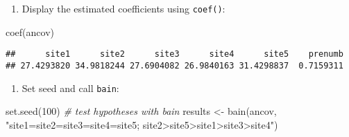 \documentclass[
]{book}
\newenvironment{Shaded}{\begin{snugshade}}{\end{snugshade}}
\newcommand{\CommentTok}[1]{\textcolor[rgb]{0.56,0.35,0.01}{\textit{#1}}}
\newcommand{\DecValTok}[1]{\textcolor[rgb]{0.00,0.00,0.81}{#1}}
\newcommand{\FunctionTok}[1]{\textcolor[rgb]{0.00,0.00,0.00}{#1}}
\newcommand{\NormalTok}[1]{#1}
\newcommand{\OtherTok}[1]{\textcolor[rgb]{0.56,0.35,0.01}{#1}}
\newcommand{\SpecialCharTok}[1]{\textcolor[rgb]{0.00,0.00,0.00}{#1}}
\newcommand{\StringTok}[1]{\textcolor[rgb]{0.31,0.60,0.02}{#1}}
\providecommand{\tightlist}{%
  \setlength{\itemsep}{0pt}\setlength{\parskip}{0pt}}
\begin{document}
\begin{Shaded}
\end{Shaded}

\begin{enumerate}
\def\labelenumi{\arabic{enumi})}
\setcounter{enumi}{1}
\tightlist
\item
  Display the estimated coefficients using \texttt{coef()}:
\end{enumerate}

\begin{Shaded}
\begin{Highlighting}[]
\FunctionTok{coef}\NormalTok{(ancov)}
\end{Highlighting}
\end{Shaded}

\begin{verbatim}
##      site1      site2      site3      site4      site5    prenumb 
## 27.4293820 34.9818244 27.6904082 26.9840163 31.4298837  0.7159311
\end{verbatim}

\begin{enumerate}
\def\labelenumi{\arabic{enumi})}
\setcounter{enumi}{2}
\tightlist
\item
  Set seed and call \texttt{bain}:
\end{enumerate}

\begin{Shaded}
\begin{Highlighting}[]
\FunctionTok{set.seed}\NormalTok{(}\DecValTok{100}\NormalTok{)}
\CommentTok{\# test hypotheses with bain}
\NormalTok{results }\OtherTok{\textless{}{-}} \FunctionTok{bain}\NormalTok{(ancov, }\StringTok{"site1=site2=site3=site4=site5;}
\StringTok{                        site2\textgreater{}site5\textgreater{}site1\textgreater{}site3\textgreater{}site4"}\NormalTok{)}
\end{Highlighting}
\end{Shaded}
\end{document}
